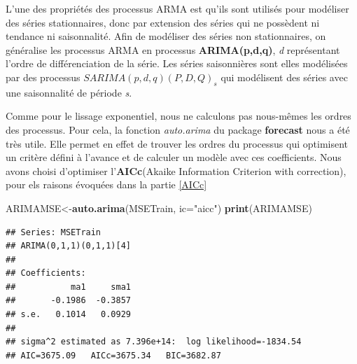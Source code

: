 \documentclass[11pt,]{article}
\newenvironment{Shaded}{\begin{snugshade}}{\end{snugshade}}
\newcommand{\KeywordTok}[1]{\textcolor[rgb]{0.13,0.29,0.53}{\textbf{#1}}}
\newcommand{\DataTypeTok}[1]{\textcolor[rgb]{0.13,0.29,0.53}{#1}}
\newcommand{\DecValTok}[1]{\textcolor[rgb]{0.00,0.00,0.81}{#1}}
\newcommand{\StringTok}[1]{\textcolor[rgb]{0.31,0.60,0.02}{#1}}
\newcommand{\OperatorTok}[1]{\textcolor[rgb]{0.81,0.36,0.00}{\textbf{#1}}}
\newcommand{\NormalTok}[1]{#1}
\begin{document}
L'une des propriétés des processus ARMA est qu'ils sont utilisés pour
modéliser des séries stationnaires, donc par extension des séries qui ne
possèdent ni tendance ni saisonnalité. Afin de modéliser des séries non
stationnaires, on généralise les processus ARMA en processus
\textbf{ARIMA(p,d,q)}, \emph{d} représentant l'ordre de différenciation
de la série. Les séries saisonnières sont elles modélisées par des
processus \textbf{\(SARIMA(p ,d, q)(P, D, Q)_s\)} qui modélisent des
séries avec une saisonnalité de période \emph{s}.

Comme pour le lissage exponentiel, nous ne calculons pas nous-mêmes les
ordres des processus. Pour cela, la fonction \emph{auto.arima} du
package \textbf{forecast} nous a été très utile. Elle permet en effet de
trouver les ordres du processus qui optimisent un critère défini à
l'avance et de calculer un modèle avec ces coefficients. Nous avons
choisi d'optimiser l'\textbf{AICc}(Akaike Information Criterion with
correction), pour els raisons évoquées dans la partie \ref{AICc}

\begin{Shaded}
\begin{Highlighting}[]
\NormalTok{ARIMAMSE<-}\KeywordTok{auto.arima}\NormalTok{(MSETrain, }\DataTypeTok{ic=}\StringTok{"aicc"}\NormalTok{)}
\KeywordTok{print}\NormalTok{(ARIMAMSE)}
\end{Highlighting}
\end{Shaded}

\begin{verbatim}
## Series: MSETrain 
## ARIMA(0,1,1)(0,1,1)[4] 
## 
## Coefficients:
##           ma1     sma1
##       -0.1986  -0.3857
## s.e.   0.1014   0.0929
## 
## sigma^2 estimated as 7.396e+14:  log likelihood=-1834.54
## AIC=3675.09   AICc=3675.34   BIC=3682.87
\end{verbatim}

\begin{Shaded}
\end{Shaded}
\end{document}
